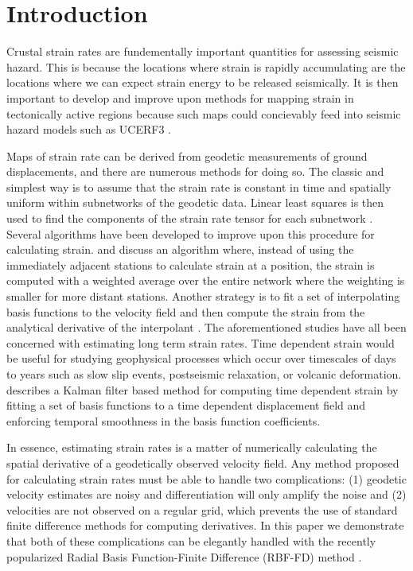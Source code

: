 \documentclass[10pt,a4paper]{article}
\begin{document}
\section{Introduction}\label{sec:Introduction}
Crustal strain rates are fundementally important quantities for assessing seismic hazard. This is because the locations where strain is rapidly accumulating are the locations where we can expect strain energy to be released seismically.  It is then important to develop and improve upon methods for mapping strain in tectonically active regions because such maps could concievably feed into seismic hazard models such as UCERF3 \citep{Field2014}. 

Maps of strain rate can be derived from geodetic measurements of ground displacements, and there are numerous methods for doing so.  The classic and simplest way is to assume that the strain rate is constant in time and spatially uniform within subnetworks of the geodetic data.  Linear least squares is then used to find the components of the strain rate tensor for each subnetwork \citep[e.g][]{Frank1966,Prescott1976,Savage1986,Feigl1993,Murray2000}. Several algorithms have been developed to improve upon this procedure for calculating strain. \citet{Shen1996} and \citet{Shen2015} discuss an algorithm where, instead of using the immediately adjacent stations to calculate strain at a position, the strain is computed with a weighted average over the entire network where the weighting is smaller for more distant stations.  Another strategy is to fit a set of interpolating basis functions to the velocity field and then compute the strain from the analytical derivative of the interpolant \citep[e.g.][]{Beavan2001,Tape2009,Sandwell2016}.  The aforementioned studies have all been concerned with estimating long term strain rates.  Time dependent strain would be useful for studying geophysical processes which occur over timescales of days to years such as slow slip events, postseismic relaxation, or volcanic deformation.  \citet{Ohtani2010} describes a Kalman filter based method for computing time dependent strain by fitting a set of basis functions to a time dependent displacement field and enforcing temporal smoothness in the basis function coefficients.   

In essence, estimating strain rates is a matter of numerically calculating the spatial derivative of a geodetically observed velocity field.  Any method proposed for calculating strain rates must be able to handle two complications: (1) geodetic velocity estimates are noisy and differentiation will only amplify the noise and (2) velocities are not observed on a regular grid, which prevents the use of standard finite difference methods for computing derivatives.  In this paper we demonstrate that both of these complications can be elegantly handled with the recently popularized Radial Basis Function-Finite Difference (RBF-FD) method \citep{Wright2006}.  
\end{document}
